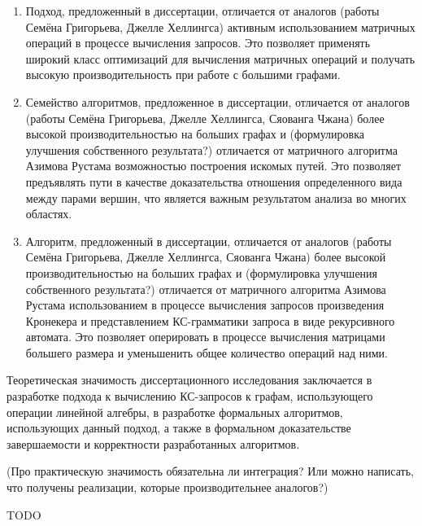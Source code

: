 {\novelty}
\begin{enumerate}[beginpenalty=10000] %
	
	\item Подход, предложенный в диссертации, отличается от аналогов (работы Семёна Григорьева, Джелле Хеллингса) активным использованием матричных операций в процессе вычисления запросов. Это позволяет применять широкий класс оптимизаций для вычисления матричных операций и получать высокую производительность при работе с большими графами.
	
	\item Семейство алгоритмов, предложенное в диссертации, отличается от аналогов (работы Семёна Григорьева, Джелле Хеллингса, Сяованга Чжана) более высокой производительностью на больших графах и (формулировка улучшения собственного результата?) отличается от матричного алгоритма Азимова Рустама возможностью построения искомых путей. Это позволяет предъявлять пути в качестве доказательства отношения определенного вида между парами вершин, что является важным результатом анализа во многих областях.
	
	\item Алгоритм, предложенный в диссертации, отличается от аналогов (работы Семёна Григорьева, Джелле Хеллингса, Сяованга Чжана) более высокой производительностью на больших графах и (формулировка улучшения собственного результата?) отличается от матричного алгоритма Азимова Рустама использованием в процессе вычисления запросов произведения Кронекера и представлением КС-грамматики запроса в виде рекурсивного автомата. Это позволяет оперировать в процессе вычисления матрицами большего размера и уменьшенить общее количество операций над ними.
	
\end{enumerate}

{\influence} 

Теоретическая значимость диссертационного исследования заключается в разработке подхода к вычислению КС-запросов к графам, использующего операции линейной алгебры, в разработке формальных алгоритмов, использующих данный подход, а также в формальном доказательстве завершаемости и корректности разработанных алгоритмов.

(Про практическую значимость обязательна ли интеграция? Или можно написать, что получены реализации, которые производительнее аналогов?)


{\methods} TODO

